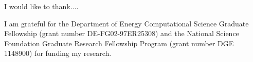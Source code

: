 
I would like to thank....

I am grateful for the Department of Energy Computational Science Graduate Fellowship (grant number DE-FG02-97ER25308) and the National Science Foundation Graduate Research Fellowship Program (grant number DGE 1148900) for funding my research. 